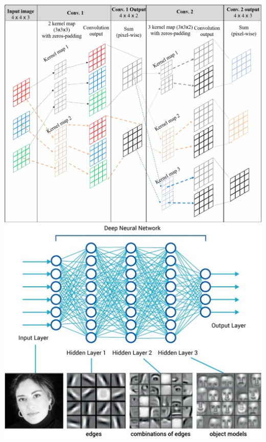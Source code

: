 \documentclass{book}
\begin{document}
\begin{center}
    \includegraphics[scale=0.24]{chapter 9/ch9_figure2.jpeg}
    \hspace{0.5cm}
    \includegraphics[scale=0.23]{chapter 9/ch9_figure3.jpeg}
\end{center}
\end{document}
